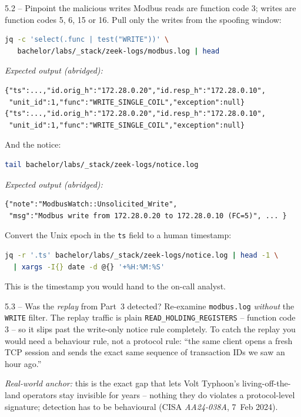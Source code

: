 \documentclass[11pt,a4paper]{article}
\begin{document}
\begin{stepbox}{5.2 -- Pinpoint the malicious writes}
Modbus reads are function code 3; writes are function codes 5, 6,
15 or 16. Pull only the writes from the spoofing window:
\begin{lstlisting}[language=bash]
jq -c 'select(.func | test("WRITE"))' \
   bachelor/labs/_stack/zeek-logs/modbus.log | head
\end{lstlisting}
\textit{Expected output (abridged):}
\begin{lstlisting}
{"ts":...,"id.orig_h":"172.28.0.20","id.resp_h":"172.28.0.10",
 "unit_id":1,"func":"WRITE_SINGLE_COIL","exception":null}
{"ts":...,"id.orig_h":"172.28.0.20","id.resp_h":"172.28.0.10",
 "unit_id":1,"func":"WRITE_SINGLE_COIL","exception":null}
\end{lstlisting}
And the notice:
\begin{lstlisting}[language=bash]
tail bachelor/labs/_stack/zeek-logs/notice.log
\end{lstlisting}
\textit{Expected output (abridged):}
\begin{lstlisting}
{"note":"ModbusWatch::Unsolicited_Write",
 "msg":"Modbus write from 172.28.0.20 to 172.28.0.10 (FC=5)", ... }
\end{lstlisting}
Convert the Unix epoch in the \texttt{ts} field to a human
timestamp:
\begin{lstlisting}[language=bash]
jq -r '.ts' bachelor/labs/_stack/zeek-logs/notice.log | head -1 \
  | xargs -I{} date -d @{} '+%H:%M:%S'
\end{lstlisting}
This is the timestamp you would hand to the on-call analyst.
\end{stepbox}

\begin{stepbox}{5.3 -- Was the \emph{replay} from Part~3 detected?}
Re-examine \texttt{modbus.log} \emph{without} the
\texttt{WRITE} filter. The replay traffic is plain
\texttt{READ\_HOLDING\_REGISTERS} -- function code 3 -- so it slips
past the write-only notice rule completely. To catch the replay
you would need a behaviour rule, not a protocol rule: ``the same
client opens a fresh TCP session and sends the exact same
sequence of transaction IDs we saw an hour ago.''

\emph{Real-world anchor:} this is the exact gap that lets
Volt Typhoon's living-off-the-land operators stay invisible for
years -- nothing they do violates a protocol-level signature;
detection has to be behavioural (CISA \emph{AA24-038A},
7~Feb 2024).
\end{stepbox}
\end{document}
